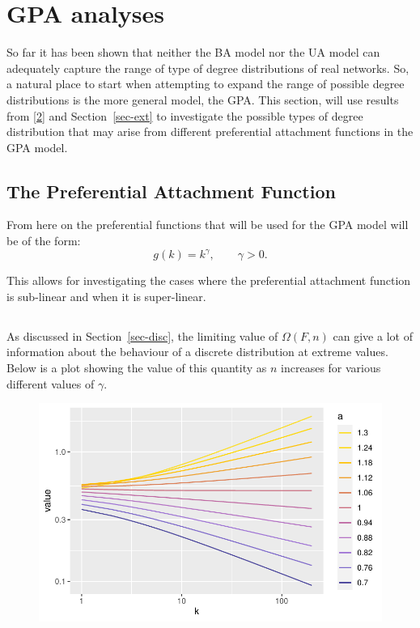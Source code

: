 \documentclass[
  10pt,
  a4paper,
]{scrreprt}
\theoremstyle{plain}
\theoremstyle{plain}
\theoremstyle{definition}
\theoremstyle{plain}
\theoremstyle{remark}
\begin{document}
{\hypertarget{gpa-analyses}{%
\section{GPA analyses}\label{gpa-analyses}}

So far it has been shown that neither the BA model nor the UA model can
adequately capture the range of type of degree distributions of real
networks. So, a natural place to start when attempting to expand the
range of possible degree distributions is the more general model, the
GPA. This section, will use results from
{[}\protect\hyperlink{ref-shimura12}{2}{]} and Section~\ref{sec-ext} to
investigate the possible types of degree distribution that may arise
from different preferential attachment functions in the GPA model.

\hypertarget{the-preferential-attachment-function}{%
\subsection{The Preferential Attachment
Function}\label{the-preferential-attachment-function}}

From here on the preferential functions that will be used for the GPA
model will be of the form: \[
g(k) = k^\gamma, \qquad \gamma>0.
\]

This allows for investigating the cases where the preferential
attachment function is sub-linear and when it is super-linear.

\hypertarget{section}{%
\subsection{}\label{section}}

As discussed in Section~\ref{sec-disc}, the limiting value of
\(\Omega(F,n)\) can give a lot of information about the behaviour of a
discrete distribution at extreme values. Below is a plot showing the
value of this quantity as \(n\) increases for various different values
of \(\gamma\).

\begin{figure}[H]

{\centering \includegraphics{doc_files/figure-pdf/fig-omega-1.pdf}

}
\end{figure}}
\end{document}
